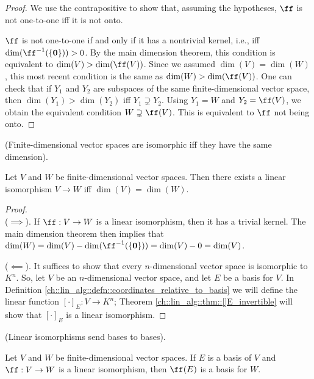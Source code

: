 \begin{proof}
    We use the contrapositive to show that, assuming the hypotheses, $\ff$ is not one-to-one iff it is not onto.
    
    $\ff$ is not one-to-one if and only if it has a nontrivial kernel, i.e., iff $\dim(\ff^{-1}(\{\mathbf{0}\})) > 0$. By the main dimension theorem, this condition is equivalent to $\dim(V) > \dim(\ff(V))$. Since we assumed $\dim(V) = \dim(W)$, this most recent condition is the same as $\dim(W) > \dim(\ff(V))$. One can check that if $Y_1$ and $Y_2$ are subspaces of the same finite-dimensional vector space, then $\dim(Y_1) > \dim(Y_2)$ iff $Y_1 \supsetneq Y_2$. Using $Y_1 = W$ and $Y_2 = \ff(V)$, we obtain the equivalent condition $W \supsetneq \ff(V)$. This is equivalent to $\ff$ not being onto.
\end{proof}

\begin{theorem}
\label{ch::lin_alg::thm::same_dim_iff_isomorphic}
    (Finite-dimensional vector spaces are isomorphic iff they have the same dimension).
    
    Let $V$ and $W$ be finite-dimensional vector spaces. Then there exists a linear isomorphism $V \rightarrow W$ iff $\dim(V) = \dim(W)$.
\end{theorem}

\begin{proof}
    \mbox{} \\ \indent
    ($\implies$). If $\ff:V \rightarrow W$ is a linear isomorphism, then it has a trivial kernel. The main dimension theorem then implies that $\dim(W) = \dim(V) - \dim(\ff^{-1}(\{\mathbf{0}\})) = \dim(V) - 0 = \dim(V)$.
    
    ($\impliedby$). It suffices to show that every $n$-dimensional vector space is isomorphic to $K^n$. So, let $V$ be an $n$-dimensional vector space, and let $E$ be a basis for $V$. In Definition \ref{ch::lin_alg::defn::coordinates_relative_to_basis} we will define the linear function $[\cdot]_E:V \rightarrow K^n$; Theorem \ref{ch::lin_alg::thm::[]E_invertible} will show that $[\cdot]_E$ is a linear isomorphism.
\end{proof}

\begin{theorem}
    \label{ch::lin_alg::thm::iso_bases_to_bases}
    (Linear isomorphisms send bases to bases).

    Let $V$ and $W$ be finite-dimensional vector spaces. If $E$ is a basis of $V$ and $\ff:V \rightarrow W$ is a linear isomorphism, then $\ff(E)$ is a basis for $W$.
\end{theorem}

